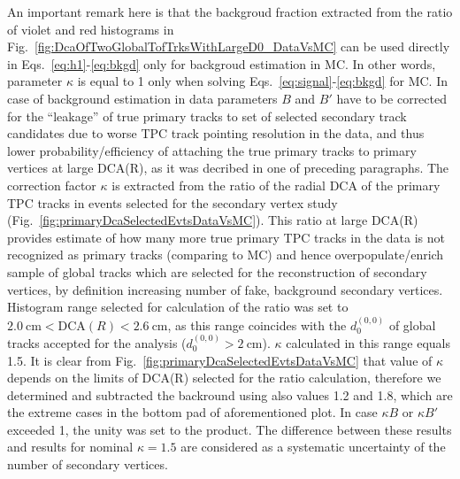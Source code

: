 An important remark here is that the backgroud fraction extracted from the ratio of violet and red histograms in Fig.~\ref{fig:DcaOfTwoGlobalTofTrksWithLargeD0_DataVsMC} can be used directly in Eqs.~\eqref{eq:h1}-\eqref{eq:bkgd} only for backgroud estimation in MC. In other words, parameter $\kappa$ is equal to 1 only when solving Eqs.~\eqref{eq:signal}-\eqref{eq:bkgd} for MC. In case of background estimation in data parameters $B$ and $B'$ have to be corrected for the ``leakage'' of true primary tracks to set of selected secondary track candidates due to worse TPC track pointing resolution in the data, and thus lower probability/efficiency of attaching the true primary tracks to primary vertices at large DCA(R), as it was decribed in one of preceding paragraphs. The correction factor $\kappa$ is extracted from the ratio of the radial DCA of the primary TPC tracks in events selected for the secondary vertex study (Fig.~\ref{fig:primaryDcaSelectedEvtsDataVsMC}). This ratio at large DCA(R) provides estimate of how many more true primary TPC tracks in the data is not recognized as primary tracks (comparing to MC) and hence overpopulate/enrich sample of global tracks which are selected for the reconstruction of secondary vertices, by definition increasing number of fake, background secondary vertices. Histogram range selected for calculation of the ratio was set to $2.0~\text{cm}<\text{DCA}(R)<2.6~\text{cm}$, as this range coincides with the $d_{0}^{(0,0)}$ of global tracks accepted for the analysis ($d_{0}^{(0,0)}>2~\text{cm}$). $\kappa$ calculated in this range equals 1.5. It is clear from Fig.~\ref{fig:primaryDcaSelectedEvtsDataVsMC} that value of $\kappa$ depends on the limits of DCA(R) selected for the ratio calculation, therefore we determined and subtracted the backround using also values 1.2 and 1.8, which are the extreme cases in the bottom pad of aforementioned plot. In case $\kappa B$ or $\kappa B'$ exceeded 1, the unity was set to the product. The difference between these results and results for nominal $\kappa=1.5$ are considered as a systematic uncertainty of the number of secondary vertices.

